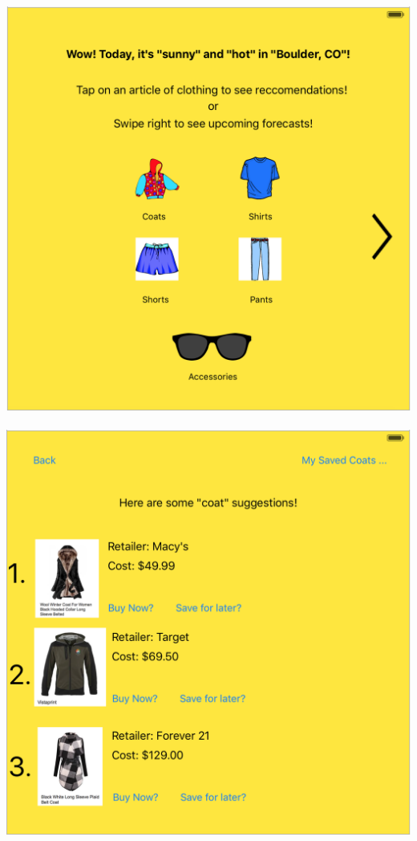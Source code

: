 \documentclass[12pt,a4paper]{article}
\begin{document}
\includegraphics[scale=0.4]{mainscreen.png}\\\\
\includegraphics[scale=0.5]{suggestions.png}\\\\
\end{document}
